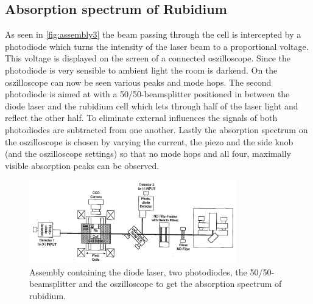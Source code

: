 \subsection{Absorption spectrum of Rubidium}
As seen in \autoref{fig:assembly3} the beam passing through the cell is intercepted by a photodiode which turns the intensity of the laser beam to a proportional voltage.
This voltage is displayed on the screen of a connected oszilloscope.
Since the photodiode is very sensible to ambient light the room is darkend.
On the oszilloscope can now be seen various peaks and mode hops.
The second photodiode is aimed at with a 50/50-beamsplitter positioned in between the diode laser and the rubidium cell which lets through half of the laser light and reflect the other half.
To eliminate external influences the signals of both photodiodes are subtracted from one another.
Lastly the absorption spectrum on the oszilloscope is chosen by varying the current, the piezo and the side knob (and the oszilloscope settings) so that no mode hops and all four, maximally visible absorption peaks can be observed.
\begin{figure}
    \center
    \includegraphics[width=0.8\textwidth]{bilder/Assembly_3.png}
    \caption{Assembly containing the diode laser, two photodiodes, the 50/50-beamsplitter and the oszilloscope to get the absorption spectrum of rubidium. \cite{anleitung}}
    \label{fig:assembly3}
\end{figure}

\FloatBarrier
